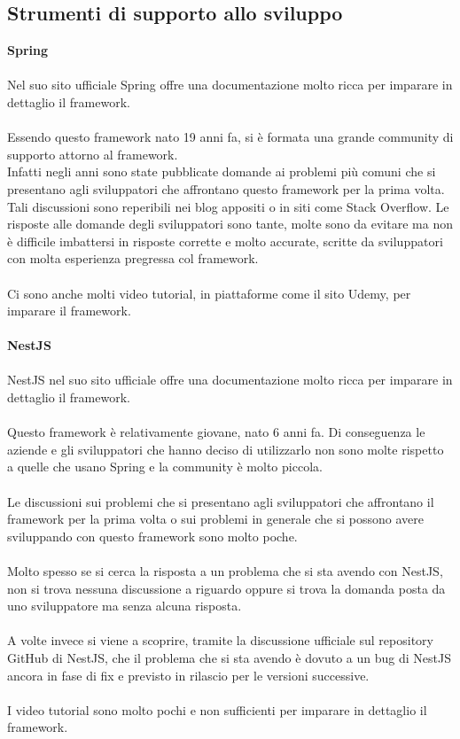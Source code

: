 \subsection{Strumenti di supporto allo sviluppo}
\textbf{Spring}
\\\\
Nel suo sito ufficiale Spring offre una documentazione molto ricca per imparare in dettaglio il framework.
\\\\
Essendo questo framework nato 19 anni fa, si è formata una grande community di supporto attorno al framework. 
\\
Infatti negli anni sono state pubblicate domande ai problemi più comuni che si presentano agli sviluppatori
che affrontano questo framework per la prima volta. 
\\
Tali discussioni sono reperibili nei blog appositi o in siti come Stack Overflow. Le risposte alle domande
degli sviluppatori sono tante, molte sono da evitare ma non è difficile imbattersi in risposte
corrette e molto accurate, scritte da sviluppatori con molta esperienza pregressa col framework.
\\\\
Ci sono anche molti video tutorial, in piattaforme come il sito Udemy, per imparare il framework.
\\\\
\textbf{NestJS}
\\\\
NestJS nel suo sito ufficiale offre una documentazione molto ricca per imparare in dettaglio il framework.
\\\\
Questo framework è relativamente giovane, nato 6 anni fa. Di conseguenza le aziende e gli sviluppatori che hanno
deciso di utilizzarlo non sono molte rispetto a quelle che usano Spring e la community è molto piccola.
\\\\
Le discussioni sui problemi che si presentano agli sviluppatori che affrontano il framework per la prima volta
o sui problemi in generale che si possono avere sviluppando con questo framework sono molto poche. 
\\\\
Molto spesso se si cerca la risposta a un problema che si sta avendo con NestJS, non si trova nessuna discussione
a riguardo oppure si trova la domanda posta da uno sviluppatore ma senza alcuna risposta.
\\\\
A volte invece si viene a scoprire, tramite la discussione ufficiale sul repository GitHub di NestJS, che il 
problema che si sta avendo è dovuto a un bug di NestJS ancora in fase di fix e previsto in rilascio per le versioni
successive.
\\\\
I video tutorial sono molto pochi e non sufficienti per imparare in dettaglio il framework.

